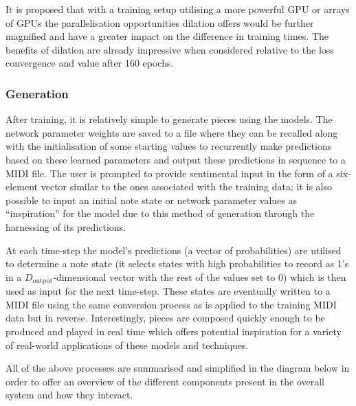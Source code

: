 \documentclass[12pt,]{article}
\begin{document}
It is proposed that with a training setup utilising a more powerful GPU
or arrays of GPUs the parallelisation opportunities dilation offers
would be further magnified and have a greater impact on the difference
in training times. The benefits of dilation are already impressive when
considered relative to the loss convergence and value after 160 epochs.

\hypertarget{generation}{%
\subsubsection{Generation}\label{generation}}

After training, it is relatively simple to generate pieces using the
models. The network parameter weights are saved to a file where they can
be recalled along with the initialisation of some starting values to
recurrently make predictions based on these learned parameters and
output these predictions in sequence to a MIDI file. The user is
prompted to provide sentimental input in the form of a six-element
vector similar to the ones associated with the training data; it is also
possible to input an initial note state or network parameter values as
``inspiration'' for the model due to this method of generation through
the harnessing of its predictions.

At each time-step the model's predictions (a vector of probabilities)
are utilised to determine a note state (it selects states with high
probabilities to record as 1's in a \(D_{\text{output}}\)-dimensional
vector with the rest of the values set to 0) which is then used as input
for the next time-step. These states are eventually written to a MIDI
file using the same conversion process as is applied to the training
MIDI data but in reverse. Interestingly, pieces are composed quickly
enough to be produced and played in real time which offers potential
inspiration for a variety of real-world applications of these models and
techniques.

All of the above processes are summarised and simplified in the diagram
below in order to offer an overview of the different components present
in the overall system and how they interact.
\end{document}
